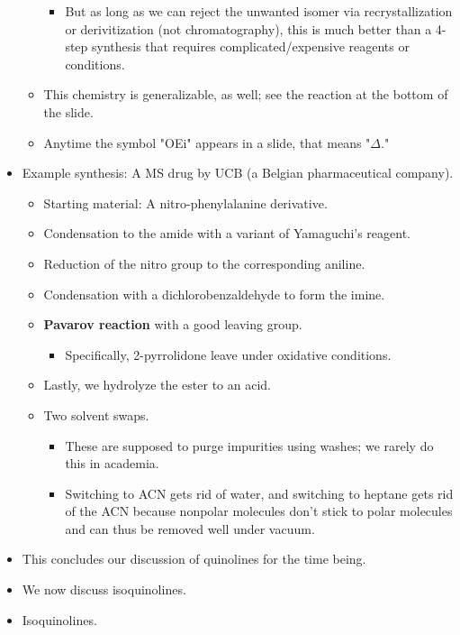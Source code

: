 \documentclass[../notes.tex]{subfiles}
\begin{document}
\begin{itemize}
\begin{itemize}
\begin{itemize}
            \item But as long as we can reject the unwanted isomer via recrystallization or derivitization (not chromatography), this is much better than a 4-step synthesis that requires complicated/expensive reagents or conditions.
        \end{itemize}
        \item This chemistry is generalizable, as well; see the reaction at the bottom of the slide.
        \item Anytime the symbol "OEi" appears in a slide, that means "$\Delta$."
    \end{itemize}
    \item Example synthesis: A MS drug by UCB (a Belgian pharmaceutical company).
    \begin{itemize}
        \item Starting material: A nitro-phenylalanine derivative.
        \item Condensation to the amide with a variant of Yamaguchi's reagent.
        \item Reduction of the nitro group to the corresponding aniline.
        \item Condensation with a dichlorobenzaldehyde to form the imine.
        \item \textbf{Pavarov reaction} with a good leaving group.
        \begin{itemize}
            \item Specifically, 2-pyrrolidone leave under oxidative conditions.
        \end{itemize}
        \item Lastly, we hydrolyze the ester to an acid.
        \item Two solvent swaps.
        \begin{itemize}
            \item These are supposed to purge impurities using washes; we rarely do this in academia.
            \item Switching to ACN gets rid of water, and switching to heptane gets rid of the ACN because nonpolar molecules don't stick to polar molecules and can thus be removed well under vacuum.
        \end{itemize}
    \end{itemize}
    \item This concludes our discussion of quinolines for the time being.
    \item We now discuss isoquinolines.
    \item Isoquinolines.

\end{itemize}
\end{document}
